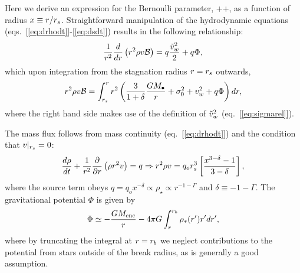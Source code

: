 Here we derive an expression for the Bernoulli parameter, \be
{} \equiv \ke +\gammaf {}+\Phi, \ee
as a function of radius $x \equiv r/r_s$.  Straightforward manipulation of the hydrodynamic equations (eqs.~[\ref{eq:drhodt}]-[\ref{eq:dsdt}]) results in the following relationship: 
\begin{align}
\frac{1}{r^2} \frac{d}{dr} \left(r^2 \rho v \mathcal{B} \right) = q \frac{\tilde{v}_{w}^2}{2} + q \Phi,
\label{eq:enCons}
\end{align}
which upon integration from the stagnation radius $r = r_s$ outwards,
\begin{align}
  r^2 \rho v\mathcal{B} = \int_{r_s}^{r}
    r^2 \left(\frac{3}{1+\delta}\frac{G
  M_{\bullet}}{r}+\sigma_0^2+v_w^2 + q \Phi\right) dr,
    \label{eq:enConsInt}
\end{align}
where the right hand side makes use of the definition of $\tilde{v}_{w}^{2}$ (eq.~[\ref{eq:sigmarel}]).

The mass flux follows from mass continuity (eq.~[\ref{eq:drhodt}]) and the condition that $v|_{r_s} = 0$:
\begin{equation}
 \frac{d \rho}{d t}+\frac{1}{r^2}\frac{\partial}{\partial r}\left(\rho r^2 v\right)=q \Rightarrow r^2 \rho v = q_o r_s^3 \left[\frac{x^{3-\delta}-1}{3-\delta}\right],
 \label{eq:massFlux}
 \end{equation}
where the source term obeys $q = q_o x^{-\delta} \propto \rho_{\star} \propto r^{-1-\Gamma}$ and $\delta \equiv -1-\Gamma$.  The gravitational potential $\Phi$ is given by
\begin{align}
\Phi \simeq -\frac{G M_{\rm enc}}{r} -4 \pi G \int_{r}^{r_b} \rho_*(r') r' dr',
\label{eq:Phi}
\end{align}
where by truncating the integral at $r = r_b$ we neglect contributions to the potential from stars outside of the break radius, as is generally a good assumption.

